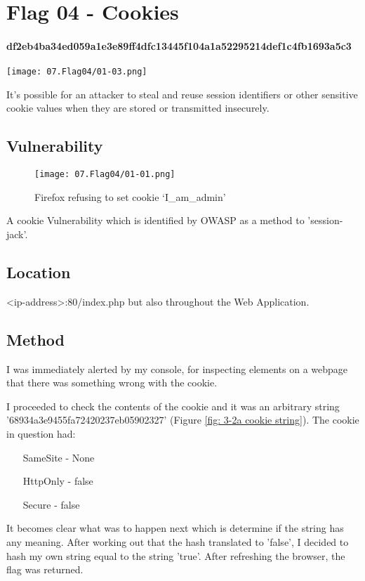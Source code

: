 \section{Flag 04 - Cookies}

\paragraph{df2eb4ba34ed059a1e3e89ff4dfc13445f104a1a52295214def1c4fb1693a5c3}
\begin{center}
    \texttt{[image: 07.Flag04/01-03.png]}\\[0cm] 
\end{center}

It's possible for an attacker to steal and reuse
session identifiers or other sensitive cookie values
when they are stored or transmitted insecurely\cite{OWASPCookie}.

\subsection{Vulnerability}

\begin{figure}[!htb]
    \centering
    \texttt{[image: 07.Flag04/01-01.png]}\\[0cm]  
    \caption[Cookie Alert]{Firefox refusing to set cookie `I\_am\_admin'}
    \label{fig:03-01 - Firefox rejects cookie iamadmin} 
\end{figure}
A cookie Vulnerability which is identified by OWASP as a
method to 'session-jack'\cite{OWASPCookie}.

\subsection{Location}

<ip-address>:80/index.php but also throughout the Web Application.

\subsection{Method}

I was immediately alerted by my console, for inspecting elements on
a webpage that there was something wrong with the cookie.

I proceeded to check the contents of the cookie and it was
an arbitrary string '68934a3e9455fa72420237eb05902327' (Figure \vref{fig: 3-2a cookie string}). The
cookie in question had:
\begin{itemize}
    \item[SameSite] - None
    \item[HttpOnly] - false
    \item[Secure] - false
\end{itemize}
It becomes clear what was to happen next which is determine if the string
has any meaning. After working out that the hash translated to 'false', I
decided to hash my own string equal to the string 'true'.
After refreshing the browser, the flag was returned.

